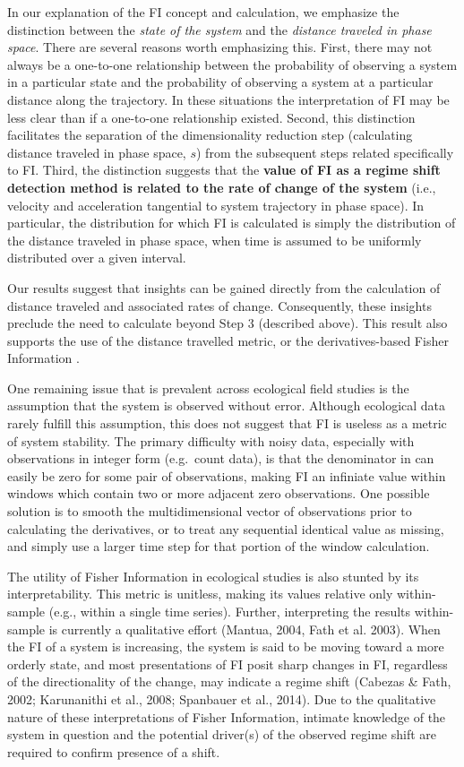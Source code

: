 \documentclass[12pt,twoside]{reedthesis}
\begin{document}
In our explanation of the FI concept and calculation, we emphasize the
distinction between the \emph{state of the system} and the
\emph{distance traveled in phase space}. There are several reasons worth
emphasizing this. First, there may not always be a one-to-one
relationship between the probability of observing a system in a
particular state and the probability of observing a system at a
particular distance along the trajectory. In these situations the
interpretation of FI may be less clear than if a one-to-one relationship
existed. Second, this distinction facilitates the separation of the
dimensionality reduction step (calculating distance traveled in phase
space, \(s\)) from the subsequent steps related specifically to FI.
Third, the distinction suggests that the \textbf{value of FI as a regime
shift detection method is related to the rate of change of the system}
(i.e., velocity and acceleration tangential to system trajectory in
phase space). In particular, the distribution for which FI is calculated
is simply the distribution of the distance traveled in phase space, when
time is assumed to be uniformly distributed over a given interval.

Our results suggest that insights can be gained directly from the
calculation of distance traveled and associated rates of change.
Consequently, these insights preclude the need to calculate beyond Step
3 (described above). This result also supports the use of the distance
travelled metric, or the derivatives-based Fisher Information
\label{eq:fiDerivs}.

One remaining issue that is prevalent across ecological field studies is
the assumption that the system is observed without error. Although
ecological data rarely fulfill this assumption, this does not suggest
that FI is useless as a metric of system stability. The primary
difficulty with noisy data, especially with observations in integer form
(e.g.~count data), is that the denominator in can easily be zero for
some pair of observations, making FI an infiniate value within windows
which contain two or more adjacent zero observations. One possible
solution is to smooth the multidimensional vector of observations prior
to calculating the derivatives, or to treat any sequential identical
value as missing, and simply use a larger time step for that portion of
the window calculation.

The utility of Fisher Information in ecological studies is also stunted
by its interpretability. This metric is unitless, making its values
relative only within-sample (e.g., within a single time series).
Further, interpreting the results within-sample is currently a
qualitative effort (Mantua, 2004, Fath et al. 2003). When the FI of a
system is increasing, the system is said to be moving toward a more
orderly state, and most presentations of FI posit sharp changes in FI,
regardless of the directionality of the change, may indicate a regime
shift (Cabezas \& Fath, 2002; Karunanithi et al., 2008; Spanbauer et
al., 2014). Due to the qualitative nature of these interpretations of
Fisher Information, intimate knowledge of the system in question and the
potential driver(s) of the observed regime shift are required to confirm
presence of a shift.
\end{document}
